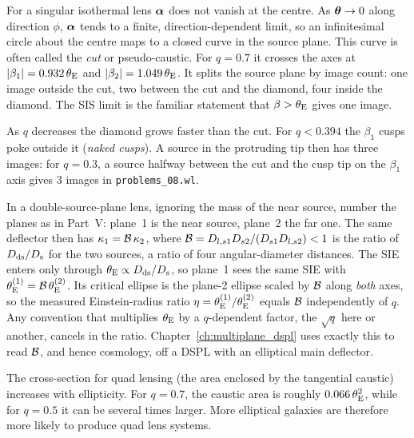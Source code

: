 \begin{annotation}
For a singular isothermal lens $\boldsymbol{\alpha}$ does not vanish at the centre.  As
$\boldsymbol{\theta} \to 0$ along direction $\phi$, $\boldsymbol{\alpha}$ tends to a finite,
direction-dependent limit, so an infinitesimal circle about the centre maps to
a closed curve in the source plane.  This curve is often called the
\emph{cut} or pseudo-caustic.  For $q = 0.7$ it crosses the axes at
$|\beta_1| = 0.932\,\theta_{\mathrm{E}}$ and $|\beta_2| = 1.049\,\theta_{\mathrm{E}}$.  It splits the
source plane by image count: one image outside the cut, two between the cut
and the diamond, four inside the diamond.  The SIS limit is the familiar
statement that $\beta > \theta_{\mathrm{E}}$ gives one image.

As $q$ decreases the diamond grows faster than the cut.  For $q < 0.394$ the
$\beta_1$ cusps poke outside it (\emph{naked cusps}).  A source in the
protruding tip then has three images: for $q = 0.3$, a source halfway between
the cut and the cusp tip on the $\beta_1$ axis gives 3 images in
\texttt{problems\_08.wl}.
\end{annotation}

\begin{bridge}
In a double-source-plane lens, ignoring the mass of the near source, number
the planes as in Part~V: plane~1 is the near source, plane~2 the far one.  The
same deflector then has $\kappa_1 = \mathcal{B}\,\kappa_2$, where
$\mathcal{B} = D_{l,s1}D_{s2}/(D_{s1}D_{l,s2}) < 1$ is the ratio of $D_{\mathrm{ds}}/D_{\mathrm{s}}$ for
the two sources, a ratio of four angular-diameter distances.
The SIE enters only through $\theta_{\mathrm{E}} \propto D_{\mathrm{ds}}/D_{\mathrm{s}}$, so plane~1 sees the
same SIE with $\theta_{\mathrm{E}}^{(1)} = \mathcal{B}\,\theta_{\mathrm{E}}^{(2)}$.  Its critical ellipse is
the plane-2 ellipse scaled by $\mathcal{B}$ along \emph{both} axes, so the measured
Einstein-radius ratio $\eta = \theta_{\mathrm{E}}^{(1)}/\theta_{\mathrm{E}}^{(2)}$ equals $\mathcal{B}$
independently of $q$.  Any convention that
multiplies $\theta_{\mathrm{E}}$ by a $q$-dependent factor, the $\sqrt{q}$ here or another,
cancels in the ratio.  Chapter~\ref{ch:multiplane_dspl} uses exactly this to
read $\mathcal{B}$, and hence cosmology, off a DSPL with an elliptical main
deflector.
\end{bridge}


The cross-section for quad lensing (the area enclosed by the
tangential caustic) increases with ellipticity.  For $q = 0.7$, the
caustic area is roughly $0.066\,\theta_{\mathrm{E}}^2$, while for $q = 0.5$ it
can be several times larger.  More elliptical galaxies are
therefore more likely to produce quad lens systems.

